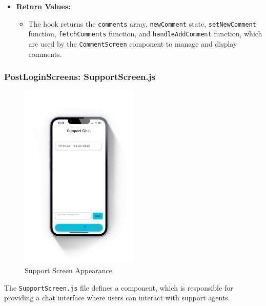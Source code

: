 \begin{itemize}
    \item \textbf{Return Values:}
    \begin{itemize}
        \item The hook returns the \texttt{comments} array, \texttt{newComment} state, \texttt{setNewComment} function, \texttt{fetchComments} function, and \texttt{handleAddComment} function, which are used by the \texttt{CommentScreen} component to manage and display comments.
    \end{itemize}
\end{itemize}

\subsubsection{PostLoginScreens: SupportScreen.js}

\begin{figure}[!ht]
    \centering
    \includegraphics[width=0.5\textwidth]
    {LATEX/Appendices/Images/Software/Frontend/support_screen.png}
    \caption{Support Screen Appearance}
    \label{fig:support screen}
\end{figure}

The \texttt{SupportScreen.js} file defines a component, which is responsible for providing a chat interface where users can interact with support agents.

